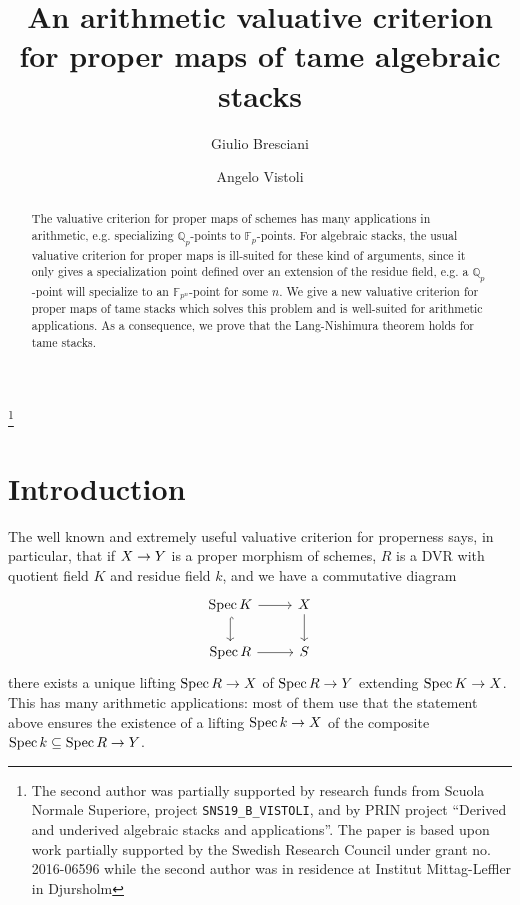 \documentclass{amsart}
\numberwithin{equation}{section}
\numberwithin{subsection}{section}
\theoremstyle{definition}
\theoremstyle{remark}
\newcommand\arr{\ifinner\to\else\longrightarrow\fi}
\newcommand\spec{\operatorname{Spec}}
\begin{document}
\title[An arithmetic valuative criterion for tame algebraic stacks]{An arithmetic valuative criterion\\for proper maps of tame algebraic stacks}


\author[Bresciani]{Giulio Bresciani}
\author[Vistoli]{Angelo Vistoli}

\address{Scuola Normale Superiore\\Piazza dei Cavalieri 7\\
56126 Pisa\\ Italy}

\thanks{The second author was partially supported by research funds from Scuola Normale Superiore, project \texttt{SNS19\_B\_VISTOLI}, and by PRIN project ``Derived and underived algebraic stacks and applications''.  The paper is based upon work partially supported by the Swedish Research Council under grant no. 2016-06596 while the second author was in residence at Institut Mittag-Leffler in Djursholm}


\begin{abstract}
	The valuative criterion for proper maps of schemes has many applications in arithmetic, e.g. specializing $\mathbb{Q}_{p}$-points to $\mathbb{F}_{p}$-points. For algebraic stacks, the usual valuative criterion for proper maps is ill-suited for these kind of arguments, since it only gives a specialization point defined over an extension of the residue field, e.g. a $\mathbb{Q}_{p}$-point will specialize to an $\mathbb{F}_{p^{n}}$-point for some $n$. We give a new valuative criterion for proper maps of tame stacks which solves this problem and is well-suited for arithmetic applications. As a consequence, we prove that the Lang-Nishimura theorem holds for tame stacks.
\end{abstract}

\maketitle

\section{Introduction}

The well known and extremely useful valuative criterion for properness says, in particular, that if $X \arr Y$ is a proper morphism of schemes, $R$ is a DVR with quotient field $K$ and residue field $k$, and we have a commutative diagram
   \[
   \begin{tikzcd}
   \spec K \ar[d, hook]\rar & X\dar\\
   \spec R \rar & S
   \end{tikzcd}
   \]
there exists a unique lifting $\spec R \arr X$ of $\spec R \arr Y$ extending $\spec K \arr X$. This has many arithmetic applications: most of them use that the statement above ensures the existence of a lifting $\spec k \arr X$ of the composite $\spec k \subseteq \spec R \arr Y$.
\end{document}
